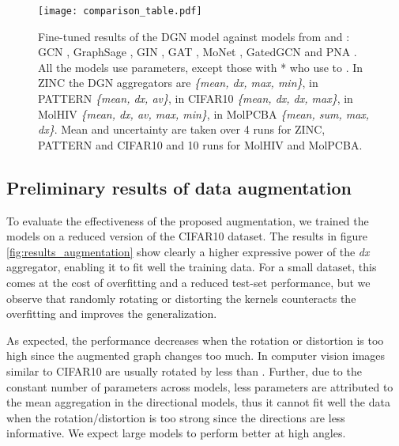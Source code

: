 \documentclass{article} \usepackage{arxiv,times}
\begin{document}
\begin{figure*}[ht]
\centering
\texttt{[image: comparison\_table.pdf]}
\vspace{-8pt}
\caption{Fine-tuned results of the DGN model against models from \cite{dwivedi2020benchmarking} and \cite{hu2020open}: GCN \cite{kipf2016gcn}, GraphSage \cite{hamilton2017inductive}, GIN \cite{xu2018gin}, GAT \cite{velikovic2017gat}, MoNet \cite{monti2017moNet}, GatedGCN \cite{bresson2017gatedGCN} and PNA \cite{corso2020principal}. All the models use  parameters, except those with * who use  to . In ZINC the DGN aggregators are \textit{\{mean, dx, max, min\}}, in PATTERN \textit{\{mean, dx, av\}}, in CIFAR10 \textit{\{mean, dx, dx, max\}}, in MolHIV \textit{\{mean, dx, av, max, min\}}, in MolPCBA \textit{\{mean, sum, max, dx\}}. Mean and uncertainty are taken over 4 runs for ZINC, PATTERN and CIFAR10 and 10 runs for MolHIV and MolPCBA.
}
\label{fig:resultscomparison}
\end{figure*}



\subsection{Preliminary results of data augmentation}

To evaluate the effectiveness of the proposed augmentation, we trained the models on a reduced version of the CIFAR10 dataset. 
The results in figure \ref{fig:results_augmentation} show clearly a higher expressive power of the \textit{dx} aggregator, enabling it to fit well the training data. For a small dataset, this comes at the cost of overfitting and a reduced test-set performance, but we observe that randomly rotating or distorting the kernels counteracts the overfitting and improves the generalization. 

As expected, the performance decreases when the rotation or distortion is too high since the augmented graph changes too much. In computer vision images similar to CIFAR10 are usually rotated by less than  \cite{shorten_survey_2019, ogara_comparing_2019}. Further, due to the constant number of parameters across models, less parameters are attributed to the mean aggregation in the directional models, thus it cannot fit well the data when the rotation/distortion is too strong since the directions are less informative. We expect large models to perform better at high angles.
\end{document}
